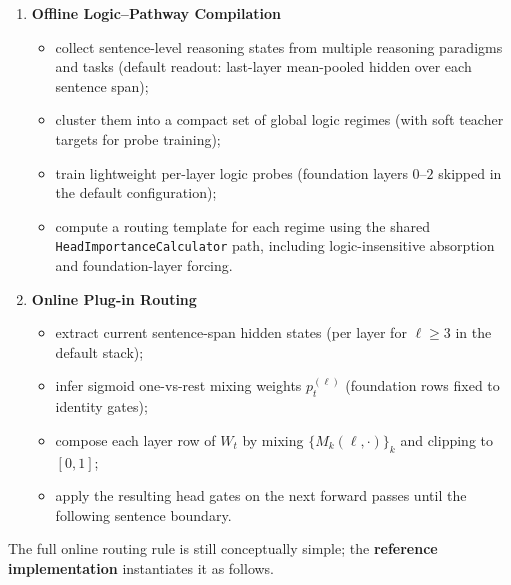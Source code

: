 \documentclass[11pt]{article}
\begin{document}
\begin{enumerate}[leftmargin=1.5em]
    \item \textbf{Offline Logic--Pathway Compilation}
    \begin{itemize}[leftmargin=1.5em]
        \item collect sentence-level reasoning states from multiple reasoning paradigms and tasks (default readout: last-layer mean-pooled hidden over each sentence span);
        \item cluster them into a compact set of global logic regimes (with soft teacher targets for probe training);
        \item train lightweight per-layer logic probes (foundation layers $0$--$2$ skipped in the default configuration);
        \item compute a routing template for each regime using the shared \texttt{HeadImportanceCalculator} path, including logic-insensitive absorption and foundation-layer forcing.
    \end{itemize}
    
    \item \textbf{Online Plug-in Routing}
    \begin{itemize}[leftmargin=1.5em]
        \item extract current sentence-span hidden states (per layer for $\ell\ge 3$ in the default stack);
        \item infer sigmoid one-vs-rest mixing weights $p_t^{(\ell)}$ (foundation rows fixed to identity gates);
        \item compose each layer row of $W_t$ by mixing $\{M_k(\ell,\cdot)\}_k$ and clipping to $[0,1]$;
        \item apply the resulting head gates on the next forward passes until the following sentence boundary.
    \end{itemize}
\end{enumerate}

The full online routing rule is still conceptually simple; the \textbf{reference implementation} instantiates it as follows.
\end{document}

